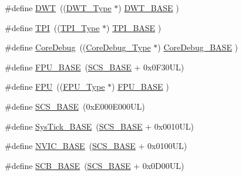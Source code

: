 \begin{DoxyCompactItemize}
\item 
\#define \mbox{\hyperlink{group___c_m_s_i_s__core__base_gabbe5a060185e1d5afa3f85b14e10a6ce}{D\+WT}}~((\mbox{\hyperlink{struct_d_w_t___type}{D\+W\+T\+\_\+\+Type}}       $\ast$)     \mbox{\hyperlink{group___c_m_s_i_s__core__base_gafdab534f961bf8935eb456cb7700dcd2}{D\+W\+T\+\_\+\+B\+A\+SE}}         )
\item 
\#define \mbox{\hyperlink{group___c_m_s_i_s__core__base_ga8b4dd00016aed25a0ea54e9a9acd1239}{T\+PI}}~((\mbox{\hyperlink{struct_t_p_i___type}{T\+P\+I\+\_\+\+Type}}       $\ast$)     \mbox{\hyperlink{group___c_m_s_i_s__core__base_ga2b1eeff850a7e418844ca847145a1a68}{T\+P\+I\+\_\+\+B\+A\+SE}}         )
\item 
\#define \mbox{\hyperlink{group___c_m_s_i_s__core__base_gab6e30a2b802d9021619dbb0be7f5d63d}{Core\+Debug}}~((\mbox{\hyperlink{struct_core_debug___type}{Core\+Debug\+\_\+\+Type}} $\ast$)     \mbox{\hyperlink{group___c_m_s_i_s__core__base_ga680604dbcda9e9b31a1639fcffe5230b}{Core\+Debug\+\_\+\+B\+A\+SE}}   )
\item 
\#define \mbox{\hyperlink{group___c_m_s_i_s__core__base_ga4dcad4027118c098c07bcd575f1fbb28}{F\+P\+U\+\_\+\+B\+A\+SE}}~(\mbox{\hyperlink{group___c_m_s_i_s__core__base_ga3c14ed93192c8d9143322bbf77ebf770}{S\+C\+S\+\_\+\+B\+A\+SE}} +  0x0\+F30\+U\+L)
\item 
\#define \mbox{\hyperlink{group___c_m_s_i_s__core__base_gabc7c93f2594e85ece1e1a24f10591428}{F\+PU}}~((\mbox{\hyperlink{struct_f_p_u___type}{F\+P\+U\+\_\+\+Type}}       $\ast$)     \mbox{\hyperlink{group___c_m_s_i_s__core__base_ga4dcad4027118c098c07bcd575f1fbb28}{F\+P\+U\+\_\+\+B\+A\+SE}}         )
\item 
\#define \mbox{\hyperlink{group___c_m_s_i_s__core__base_ga3c14ed93192c8d9143322bbf77ebf770}{S\+C\+S\+\_\+\+B\+A\+SE}}~(0x\+E000\+E000\+U\+L)
\item 
\#define \mbox{\hyperlink{group___c_m_s_i_s__core__base_ga58effaac0b93006b756d33209e814646}{Sys\+Tick\+\_\+\+B\+A\+SE}}~(\mbox{\hyperlink{group___c_m_s_i_s__core__base_ga3c14ed93192c8d9143322bbf77ebf770}{S\+C\+S\+\_\+\+B\+A\+SE}} +  0x0010\+U\+L)
\item 
\#define \mbox{\hyperlink{group___c_m_s_i_s__core__base_gaa0288691785a5f868238e0468b39523d}{N\+V\+I\+C\+\_\+\+B\+A\+SE}}~(\mbox{\hyperlink{group___c_m_s_i_s__core__base_ga3c14ed93192c8d9143322bbf77ebf770}{S\+C\+S\+\_\+\+B\+A\+SE}} +  0x0100\+U\+L)
\item 
\#define \mbox{\hyperlink{group___c_m_s_i_s__core__base_gad55a7ddb8d4b2398b0c1cfec76c0d9fd}{S\+C\+B\+\_\+\+B\+A\+SE}}~(\mbox{\hyperlink{group___c_m_s_i_s__core__base_ga3c14ed93192c8d9143322bbf77ebf770}{S\+C\+S\+\_\+\+B\+A\+SE}} +  0x0\+D00\+U\+L)

\end{DoxyCompactItemize}
